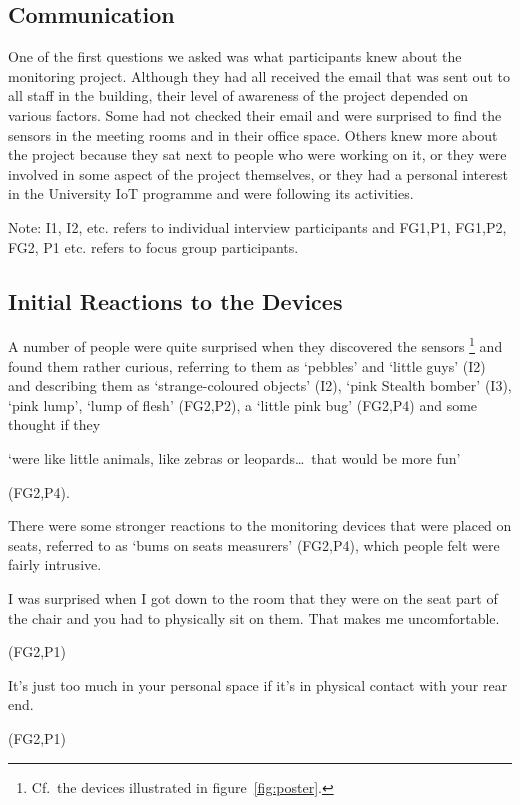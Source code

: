 \subsection{Communication}
\label{sec:communication}

One of the first questions we asked was what participants knew about
the monitoring project. Although they had all received the email that
was sent out to all staff in the building, their level of awareness of
the project depended on various factors. Some had not checked their
email and were surprised to find the sensors in the meeting rooms and
in their office space. Others knew more about the project because they sat next
to people who were working on it, or they were involved in some
aspect of the project themselves, or they had a personal interest in the
University IoT programme and were following its activities.

Note: I1, I2, etc. refers to individual interview participants and FG1,P1, FG1,P2, FG2, P1 etc. refers to focus group participants.

\subsection{Initial Reactions to the Devices}
\label{sec:init-reactions}

A number of people were quite surprised when they discovered the
sensors%
\footnote{ 
Cf.\ the devices illustrated in figure~\ref{fig:poster}.
}
and found them rather curious, referring to them as `pebbles’
and ‘little guys’ (I2) and describing them as
`strange-coloured objects’ (I2), `pink Stealth bomber’
(I3), `pink lump’, `lump of flesh’ (FG2,P2), a ‘little pink bug’ (FG2,P4) and some
thought if they \begin{qt}`were like little animals, like zebras or
leopards\ldots\  that would be more fun’\end{qt} (FG2,P4).

There were some stronger reactions to the monitoring devices that were
placed on seats, referred to as `bums on seats measurers’ (FG2,P4),
which people felt were fairly intrusive.

\begin{qt}I was surprised when I got down to the room that they were on the
seat part of the chair and you had to physically sit on them. That
makes me uncomfortable.\end{qt} (FG2,P1)

\begin{qt}It’s just too much in your personal space if it’s in
  physical contact with your rear end.\end{qt} (FG2,P1)

